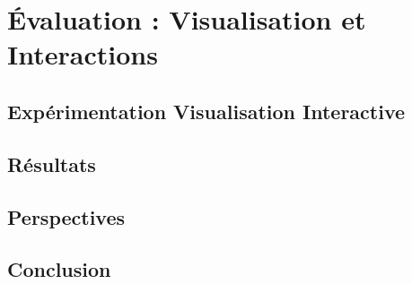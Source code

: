 \chapter{Évaluation : Visualisation et Interactions}

	\section{Expérimentation Visualisation Interactive}
		\label{sectionExpe}
		
	\section{Résultats}
	
	\section{Perspectives}
			
	\section*{Conclusion}
	